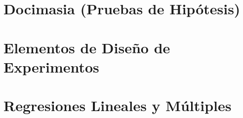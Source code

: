 \documentclass[
]{tufte-book}
\begin{document}
\chapter{Docimasia (Pruebas de Hipótesis)}






















\chapter{Elementos de Diseño de Experimentos}













\chapter{Regresiones Lineales y Múltiples}




















\end{document}
